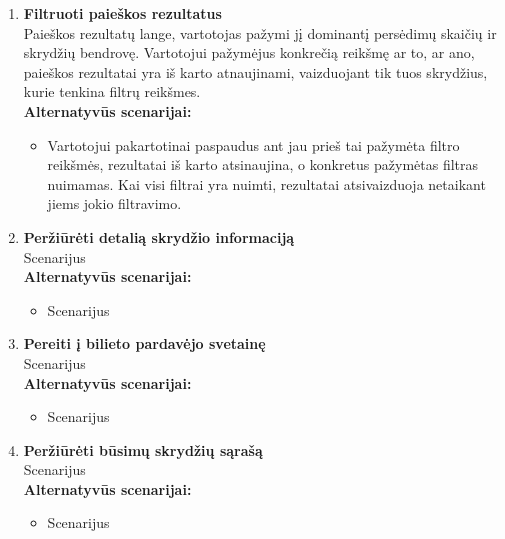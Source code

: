 \documentclass{VUMIFPSkursinis}
\begin{document}
\begin{enumerate}[label=\textbf{U\arabic*}.]
                    \item \textbf{Filtruoti paieškos rezultatus}\\
                    Paieškos rezultatų lange, vartotojas pažymi jį dominantį persėdimų skaičių ir skrydžių bendrovę. Vartotojui pažymėjus konkrečią reikšmę ar to, ar ano, paieškos rezultatai yra iš karto atnaujinami, vaizduojant tik tuos skrydžius, kurie tenkina filtrų reikšmes.
                    \\\textbf{Alternatyvūs scenarijai:}
                    \begin{itemize}
                        \item Vartotojui pakartotinai paspaudus ant jau prieš tai pažymėta filtro reikšmės, rezultatai iš karto atsinaujina, o konkretus pažymėtas filtras nuimamas. Kai visi filtrai yra nuimti, rezultatai atsivaizduoja netaikant jiems jokio filtravimo.
                    \end{itemize}

                    \item \textbf{Peržiūrėti detalią skrydžio informaciją}\\
                    Scenarijus
                    \\\textbf{Alternatyvūs scenarijai:}
                    \begin{itemize}
                        \item Scenarijus
                    \end{itemize}

                    \item \textbf{Pereiti į bilieto pardavėjo svetainę}\\
                    Scenarijus
                    \\\textbf{Alternatyvūs scenarijai:}
                    \begin{itemize}
                        \item Scenarijus
                    \end{itemize}

                    \item \textbf{Peržiūrėti būsimų skrydžių sąrašą}\\
                    Scenarijus
                    \\\textbf{Alternatyvūs scenarijai:}
                    \begin{itemize}
                        \item Scenarijus
                    \end{itemize}
                    
                \end{enumerate}
      
\end{document}
